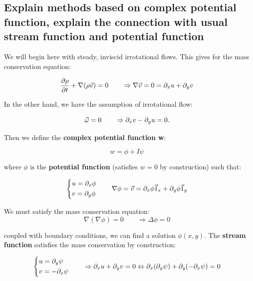 \documentclass[british,french,11pt, a4paper, openany]{article}
\begin{document}
\subsection{Explain methods based on complex potential function, explain the
	connection with usual stream function and potential function}
We will begin here with steady, inviscid irrotational flows. This gives for the mass conservation equation:

\begin{equation}
\frac{\D \rho}{\D t} + \nabla (\rho \vec{v}) = 0 \qquad \Rightarrow \nabla \vec{v} = 0 = \D _x u + \D _y v
\end{equation}

In the other hand, we have the assumption of irrotational flow:

\begin{equation}
\vec{\omega} = 0 \qquad \Rightarrow \D _x v - \D _y u = 0.
\end{equation}

Then we define the \textbf{complex potential function w}:

\begin{equation}
w = \phi + I\psi
\end{equation}		 

where $\phi$ is the \textbf{potential function} (satisfies $w=0$ by construction) such that:

\begin{equation}
\left\{
\begin{aligned}
&u = \D _x \phi \\
&v = \D _y \phi
\end{aligned}
\right.
\qquad
\nabla \phi = \vec{v} = \D _x\phi \vec{1} _x + \D _y \phi \vec{1}_y
\end{equation}

We must satisfy the mass conservation equation:
\begin{equation}
\nabla (\nabla \phi) = 0 \qquad \Rightarrow \Delta \phi = 0 
\end{equation}

coupled with boundary conditions, we can find a solution $\phi (x,y)$. The \textbf{stream function} satisfies the mass conservation by construction:

\begin{equation}
\left\{ 
\begin{aligned}
&u = \D _y \psi\\
&v = - \D _x \psi
\end{aligned}
\right.
\qquad \Rightarrow \D _x u + \D _y v = 0 \Leftrightarrow \D _x (\D _y \psi) + \D _y (- \D _x \psi) = 0
\end{equation}
\end{document}
